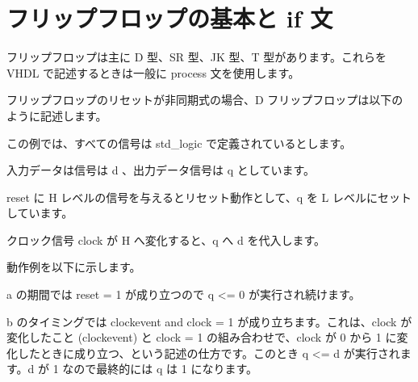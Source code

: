 \documentclass[letterpaper,10pt,dvipdfmx]{sphinxmanual}
\begin{document}
\section{フリップフロップの基本と if 文}
\label{\detokenize{05_try:if}}
フリップフロップは主に D 型、SR 型、JK 型、T 型があります。これらを VHDL で記述するときは一般に process 文を使用します。

フリップフロップのリセットが非同期式の場合、D フリップフロップは以下のように記述します。

\begin{sphinxVerbatim}[commandchars=\\\{\}]
   
      
      
        
      
   
 
\end{sphinxVerbatim}

この例では、すべての信号は std\_logic で定義されているとします。

入力データは信号は d 、出力データ信号は q としています。

reset に H レベルの信号を与えるとリセット動作として、q を L レベルにセットしています。

クロック信号 clock が H へ変化すると、q へ d を代入します。

\begin{figure}[htbp]
\centering

\noindent{}
\end{figure}

動作例を以下に示します。

\begin{figure}[htbp]
\centering

\noindent{}
\end{figure}

a の期間では reset = \textquotesingle{}1\textquotesingle{} が成り立つので q \textless{}= \textquotesingle{}0\textquotesingle{} が実行され続けます。

b のタイミングでは clock\textquotesingle{}event and clock = \textquotesingle{}1\textquotesingle{} が成り立ちます。これは、clock が変化したこと (clock\textquotesingle{}event) と clock = \textquotesingle{}1\textquotesingle{} の組み合わせで、clock が 0 から 1 に変化したときに成り立つ、という記述の仕方です。このとき q \textless{}= d が実行されます。d が 1 なので最終的には q は 1 になります。
\end{document}
